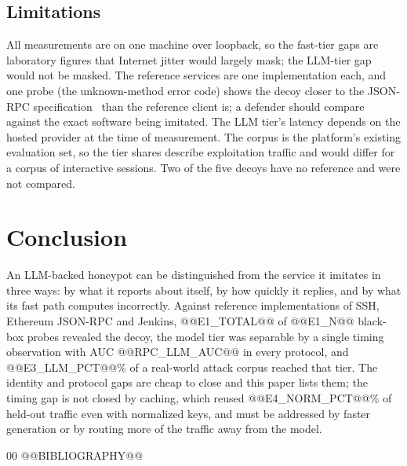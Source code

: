 \documentclass[conference]{IEEEtran}
\begin{document}
\subsection{Limitations}
All measurements are on one machine over loopback, so the fast-tier gaps are laboratory figures that Internet jitter would largely mask; the LLM-tier gap would not be masked. The reference services are one implementation each, and one probe (the unknown-method error code) shows the decoy closer to the JSON-RPC specification~\cite{ref13} than the reference client is; a defender should compare against the exact software being imitated. The LLM tier's latency depends on the hosted provider at the time of measurement. The corpus is the platform's existing evaluation set, so the tier shares describe exploitation traffic and would differ for a corpus of interactive sessions. Two of the five decoys have no reference and were not compared.

\section{Conclusion}
An LLM-backed honeypot can be distinguished from the service it imitates in three ways: by what it reports about itself, by how quickly it replies, and by what its fast path computes incorrectly. Against reference implementations of SSH, Ethereum JSON-RPC and Jenkins, @@E1_TOTAL@@ of @@E1_N@@ black-box probes revealed the decoy, the model tier was separable by a single timing observation with AUC @@RPC_LLM_AUC@@ in every protocol, and @@E3_LLM_PCT@@\% of a real-world attack corpus reached that tier. The identity and protocol gaps are cheap to close and this paper lists them; the timing gap is not closed by caching, which reused @@E4_NORM_PCT@@\% of held-out traffic even with normalized keys, and must be addressed by faster generation or by routing more of the traffic away from the model.

\begin{thebibliography}{00}
@@BIBLIOGRAPHY@@
\end{thebibliography}
\end{document}

